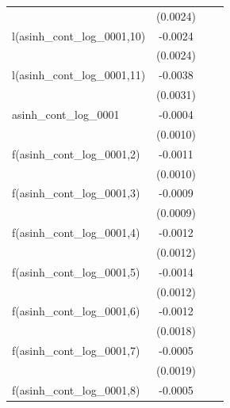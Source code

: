 \begin{tabular}{lccc}
                                               & (0.0024) &                        &   \\   
   l(asinh\_cont\_log\_0001,10)                & -0.0024  &                        &   \\   
                                               & (0.0024) &                        &   \\   
   l(asinh\_cont\_log\_0001,11)                & -0.0038  &                        &   \\   
                                               & (0.0031) &                        &   \\   
   asinh\_cont\_log\_0001                      & -0.0004  &                        &   \\   
                                               & (0.0010) &                        &   \\   
   f(asinh\_cont\_log\_0001,2)                 & -0.0011  &                        &   \\   
                                               & (0.0010) &                        &   \\   
   f(asinh\_cont\_log\_0001,3)                 & -0.0009  &                        &   \\   
                                               & (0.0009) &                        &   \\   
   f(asinh\_cont\_log\_0001,4)                 & -0.0012  &                        &   \\   
                                               & (0.0012) &                        &   \\   
   f(asinh\_cont\_log\_0001,5)                 & -0.0014  &                        &   \\   
                                               & (0.0012) &                        &   \\   
   f(asinh\_cont\_log\_0001,6)                 & -0.0012  &                        &   \\   
                                               & (0.0018) &                        &   \\   
   f(asinh\_cont\_log\_0001,7)                 & -0.0005  &                        &   \\   
                                               & (0.0019) &                        &   \\   
   f(asinh\_cont\_log\_0001,8)                 & -0.0005  &                        &   \\   

\end{tabular}

